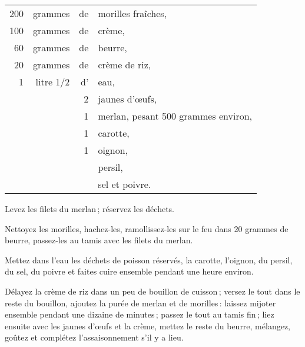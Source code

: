 \footnotesize
\begin{longtable}{rrrp{16em}}                                                    
    200 & grammes   & de & morilles fraîches,                                                             \\
    100 & grammes   & de & crème,                                                                         \\
     60 & grammes   & de & beurre,                                                                        \\
     20 & grammes   & de & crème de riz,                                                                  \\
      1 & litre 1/2 & d' & eau,                                                                           \\
        &           &  2 & jaunes d'œufs,                                                                 \\
        &           &  1 & merlan, pesant 500 grammes environ,                                            \\
        &           &  1 & carotte,                                                                       \\
        &           &  1 & oignon,                                                                        \\
        &           &    & persil,                                                                        \\
        &           &    & sel et poivre.                                                                 \\
\end{longtable}
\normalsize

Levez les filets du merlan ; réservez les déchets.

Nettoyez les morilles, hachez-les, ramollissez-les sur le feu dans 20 grammes
de beurre, passez-les au tamis avec les filets du merlan.

Mettez dans l’eau les déchets de poisson réservés, la carotte, l'oignon, du persil,
du sel, du poivre et faites cuire ensemble pendant une heure environ.

Délayez la crème de riz dans un peu de bouillon de cuisson ; versez le tout
dans le reste du bouillon, ajoutez la purée de merlan et de morilles : laissez
mijoter ensemble pendant une dizaine de minutes ; passez le tout au tamis fin ;
liez ensuite avec les jaunes d'œufs et la crème, mettez le reste du beurre,
mélangez, goûtez et complétez l’assaisonnement s'il y a lieu.

